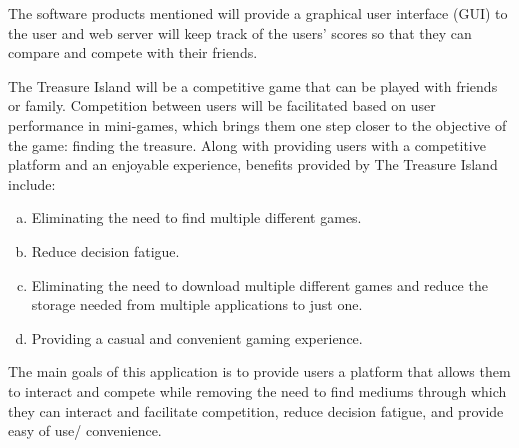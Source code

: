 \documentclass[]{article}
\begin{document}
The software products mentioned will provide a graphical user interface (GUI) to the user and web server will keep track of the users' scores so that they can compare and compete with their friends.
\newline

The Treasure Island will be a competitive game that can be played with friends or family. Competition between users will be facilitated based on user performance in mini-games, which brings them one step closer to the objective of the game: finding the treasure. Along with providing users with a competitive platform and an enjoyable experience, benefits provided by The Treasure Island include: 
\begin{enumerate}[a)]
    \item Eliminating the need to find multiple different games.
    \item Reduce decision fatigue. 
    \item Eliminating the need to download multiple different games and reduce the storage needed from multiple applications to just one.
    \item Providing a casual and convenient gaming experience. 
\end{enumerate}



The main goals of this application is to provide users a platform that allows them to interact and compete while removing the need to find mediums through which they can interact and facilitate competition, reduce decision fatigue, and provide easy of use/ convenience. 


\end{document}
